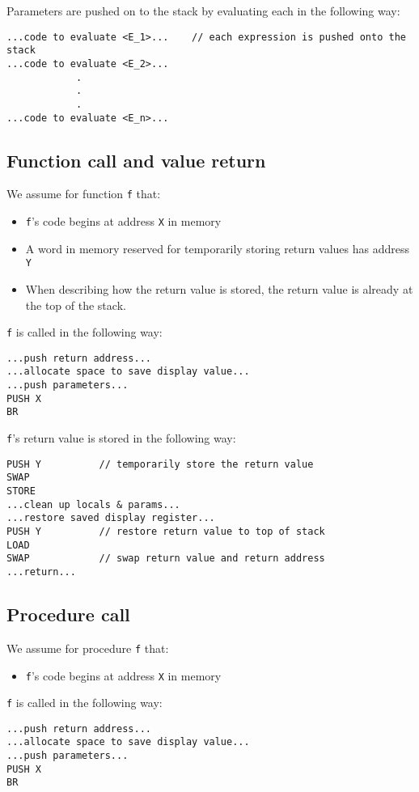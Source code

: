 \documentclass[11pt]{article}
\begin{document}
Parameters are pushed on to the stack by evaluating each in the following way:

\begin{verbatim}
...code to evaluate <E_1>...    // each expression is pushed onto the stack
...code to evaluate <E_2>...
            .
            .
            .
...code to evaluate <E_n>...
\end{verbatim}

\subsection{Function call and value return}

We assume for function \texttt{f} that:
    \begin{itemize}
    \item \texttt{f}'s code begins at address \texttt{X} in memory
    \item A word in memory reserved for temporarily storing return values has address \texttt{Y}
    \item When describing how the return value is stored, the return value is already at the top of the stack.
    \end{itemize}

\texttt{f} is called in the following way:
\begin{verbatim}
...push return address...
...allocate space to save display value...
...push parameters...
PUSH X
BR
\end{verbatim}

\texttt{f}'s return value is stored in the following way:
\begin{verbatim}
PUSH Y          // temporarily store the return value
SWAP
STORE
...clean up locals & params...
...restore saved display register...
PUSH Y          // restore return value to top of stack
LOAD
SWAP            // swap return value and return address
...return...
\end{verbatim}

\subsection{Procedure call}

We assume for procedure \texttt{f} that:
    \begin{itemize}
    \item \texttt{f}'s code begins at address \texttt{X} in memory
    \end{itemize}

\texttt{f} is called in the following way:
\begin{verbatim}
...push return address...
...allocate space to save display value...
...push parameters...
PUSH X
BR
\end{verbatim}
\end{document}
